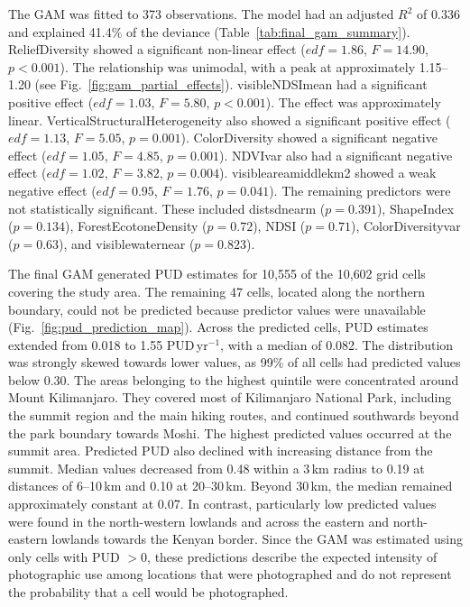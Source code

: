 \documentclass[11pt]{article}
\renewcommand{\_}{\textunderscore\allowbreak{}}
\begin{document}
The GAM was fitted to 373 observations. The model had an adjusted $R^2$ of 0.336 and explained 41.4\% of the deviance (Table~\ref{tab:final_gam_summary}). ReliefDiversity showed a significant non-linear effect ($edf = 1.86$, $F = 14.90$, $p < 0.001$). The relationship was unimodal, with a peak at approximately 1.15--1.20 (see Fig.~\ref{fig:gam_partial_effects}).
visible\_NDSI\_mean had a significant positive effect ($edf = 1.03$, $F = 5.80$, $p < 0.001$). The effect was approximately linear. VerticalStructuralHeterogeneity also showed a significant positive effect ($edf = 1.13$, $F = 5.05$, $p = 0.001$). ColorDiversity showed a significant negative effect ($edf = 1.05$, $F = 4.85$, $p = 0.001$). NDVI\_var also had a significant negative effect ($edf = 1.02$, $F = 3.82$, $p = 0.004$). visible\_area\_middle\_km2 showed a weak negative effect ($edf = 0.95$, $F = 1.76$, $p = 0.041$). The remaining predictors were not statistically significant. These included dist\_sd\_near\_m ($p = 0.391$), ShapeIndex ($p = 0.134$), ForestEcotoneDensity ($p = 0.72$), NDSI ($p = 0.71$), ColorDiversity\_var ($p = 0.63$), and visible\_water\_near ($p = 0.823$).

The final GAM generated PUD estimates for 10{,}555 of the 10{,}602 grid cells covering the study area. The remaining 47 cells, located along the northern boundary, could not be predicted because predictor values were unavailable (Fig.~\ref{fig:pud_prediction_map}). Across the predicted cells, PUD estimates extended from 0.018 to 1.55 PUD\,yr$^{-1}$, with a median of 0.082. The distribution was strongly skewed towards lower values, as 99\% of all cells had predicted values below 0.30. The areas belonging to the highest quintile were concentrated around Mount Kilimanjaro. They covered most of Kilimanjaro National Park, including the summit region and the main hiking routes, and continued southwards beyond the park boundary towards Moshi. The highest predicted values occurred at the summit area. Predicted PUD also declined with increasing distance from the summit. Median values decreased from 0.48 within a 3\,km radius to 0.19 at distances of 6--10\,km and 0.10 at 20--30\,km. Beyond 30\,km, the median remained approximately constant at 0.07. In contrast, particularly low predicted values were found in the north-western lowlands and across the eastern and north-eastern lowlands towards the Kenyan border. Since the GAM was estimated using only cells with PUD $> 0$, these predictions describe the expected intensity of photographic use among locations that were photographed and do not represent the probability that a cell would be photographed.
\end{document}
